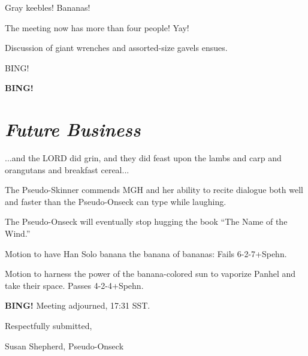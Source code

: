 \documentclass[10pt]{article}
\newcommand{\bing}{{\bf BING!} }
\newcommand{\goto}[1]{\bing \vskip 12pt \section*{{\em{#1}}}}
\begin{document}
Gray keebles! Bananas!

The meeting now has more than four people! Yay!

Discussion of giant wrenches and assorted-size gavels ensues.

BING!

\goto{Future Business}

...and the LORD did grin, and they did feast upon the lambs and carp and orangutans and breakfast cereal...

The Pseudo-Skinner commends MGH and her ability to recite dialogue both well and faster than the Pseudo-Onseck can type while laughing.

The Pseudo-Onseck will eventually stop hugging the book ``The Name of the Wind.''

Motion to have Han Solo banana the banana of bananas: Fails 6-2-7+Spehn.

Motion to harness the power of the banana-colored sun to vaporize Panhel and take their space. Passes 4-2-4+Spehn.

\bing
\noindent
Meeting adjourned, 17:31 SST.

\vspace{18pt}

\centerline{Respectfully submitted,}
\centerline{Susan Shepherd, Pseudo-Onseck}
\end{document}
